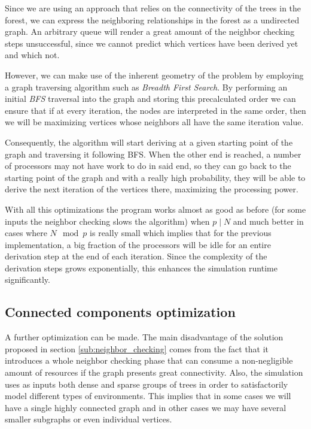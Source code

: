 \documentclass[letterpaper,twoside,11pt]{article}
\begin{document}
\begin{multicols}{2}
\begin{compactenum}[a)]
Since we are using an approach that relies on the connectivity of the trees in the forest, we can express the neighboring relationships in the forest as a undirected graph. An arbitrary queue will render a great amount of the neighbor checking steps unsuccessful, since we cannot predict which vertices have been derived yet and which not.

However, we can make use of the inherent geometry of the problem by employing a graph traversing algorithm such as \emph{Breadth First Search}. By performing an initial \emph{BFS} traversal into the graph and storing this precalculated order we can ensure that if at every iteration, the nodes are interpreted in the same order, then we will be maximizing vertices whose neighbors all have the same iteration value.

Consequently, the algorithm will start deriving at a given starting point of the graph and traversing it following BFS. When the other end is reached, a number of processors may not have work to do in said end, so they can go back to the starting point of the graph and  with a really high probability, they will be able to derive the next iteration of the vertices there, maximizing the processing power.

\end{compactenum}

With all this optimizations the program works almost as good as before (for some inputs the neighbor checking slows the algorithm) when $p \mid N$ and much better in cases where $N \mod p$ is really small which implies that for the previous implementation, a big fraction of the processors will be idle for an entire derivation step at the end of each iteration. Since the complexity of the derivation steps grows exponentially, this enhances the simulation runtime significantly.



\subsection{Connected components optimization} %
\label{sub:connected_components}

A further optimization can be made. The main disadvantage of the solution proposed in section \ref{sub:neighbor_checking} comes from the fact that it introduces a whole neighbor checking phase that can consume a non-negligible amount of resources if the graph presents great connectivity. Also, the simulation uses as inputs both dense and sparse groups of trees in order to satisfactorily model different types of environments. This implies that in some cases we will have a single highly connected graph and in other cases we may have several smaller subgraphs or even individual vertices.


\end{multicols}
\end{document}
